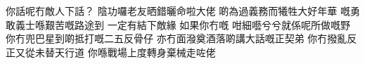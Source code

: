 \chapter{}
你話呢冇敵人下話？
陰功囉老友晒錯曬命啦大佬
啲為過義務而犧牲大好年華
嘅勇敢義士喺艱苦嘅路途到
一定有結下敵緣 如果你冇嘅
咁細囈兮兮就係呢所做嘅野
你冇兜巴星到啲抵打嘅二五反骨仔
亦冇面潑奠酒落啲講大話嘅正契弟
你冇撥亂反正又從未替天行道
你喺戰場上度轉身棄械走咗佬

